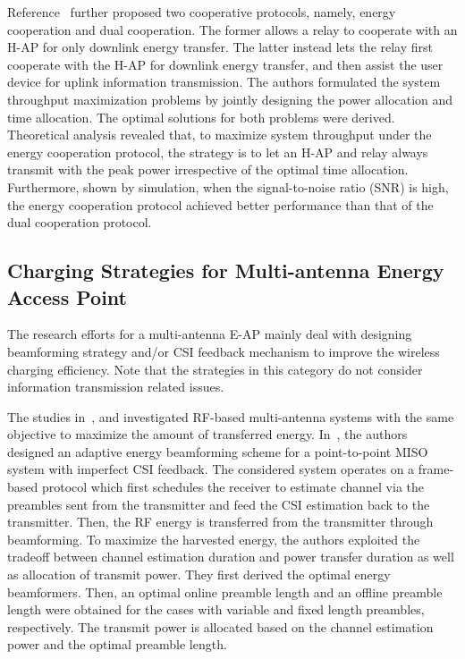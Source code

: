 \documentclass[twocolumn,10pt]{IEEEtran}
\begin{document}
Reference~\cite{H.2014Chen} further proposed two cooperative protocols, namely, energy cooperation and dual cooperation. The former allows a relay to cooperate with an H-AP for only downlink energy transfer. The latter instead lets the relay first cooperate with the H-AP for downlink energy transfer, and then assist the user device for uplink information transmission. The authors formulated the system throughput maximization problems by jointly designing the power allocation and time allocation. The optimal solutions for both problems were derived. Theoretical analysis revealed that, to maximize system throughput under the energy cooperation protocol, the strategy is to let an H-AP and relay always transmit with the peak power irrespective of the optimal time allocation. Furthermore, shown by simulation, when the signal-to-noise ratio (SNR) is high, the energy cooperation protocol achieved better performance than that of the dual cooperation protocol.




\subsection{Charging Strategies for Multi-antenna Energy Access Point}


The research efforts for a multi-antenna E-AP mainly deal with designing beamforming strategy and/or CSI feedback mechanism to improve the wireless charging efficiency. Note that the strategies in this category do not consider information transmission related issues.

The studies in~\cite{G.YangTSP}, \cite{Y.1403.7870Zeng} and \cite{Y.Zeng2015} investigated RF-based multi-antenna systems with the same objective to maximize the amount of transferred energy.
In~\cite{G.YangTSP}, the authors designed an adaptive energy beamforming scheme for a point-to-point MISO system with imperfect CSI feedback. The considered system operates on a frame-based protocol which first schedules the receiver to estimate channel via the preambles sent from the transmitter and feed the CSI estimation back to the transmitter. Then, the RF energy is transferred from the transmitter through beamforming. To maximize the harvested energy, the authors exploited the tradeoff between channel estimation duration and power transfer duration as well as allocation of transmit power. They first derived the optimal energy beamformers. Then, an optimal online preamble length and an offline preamble length were obtained for the cases with variable and fixed length preambles, respectively. The transmit power is allocated based on the channel estimation power and the optimal preamble length. 
\end{document}
